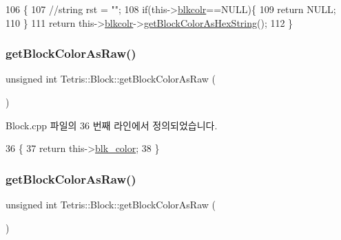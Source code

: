 \begin{DoxyCode}
106                                              \{
107                 \textcolor{comment}{//string rst = "";}
108                 \textcolor{keywordflow}{if}(this->\hyperlink{class_tetris_1_1_block_ab7cfb062eb49e791c94bac4a2e7a7ca9}{blkcolr}==NULL)\{
109                     \textcolor{keywordflow}{return} NULL;
110                 \}
111                 \textcolor{keywordflow}{return} this->\hyperlink{class_tetris_1_1_block_ab7cfb062eb49e791c94bac4a2e7a7ca9}{blkcolr}->\hyperlink{class_tetris_1_1_block_sub_modules_1_1_block_color_a79cc837f207645628542876997c9e919}{getBlockColorAsHexString}();
112             \}
\end{DoxyCode}
\mbox{\label{class_tetris_1_1_block_a8f6bd5020dcfdae501f74b42827344f3}} 
\subsubsection{\texorpdfstring{get\+Block\+Color\+As\+Raw()}{getBlockColorAsRaw()}\hspace{0.1cm}{\footnotesize\ttfamily [1/2]}}
{\footnotesize\ttfamily unsigned int Tetris\+::\+Block\+::get\+Block\+Color\+As\+Raw (\begin{DoxyParamCaption}{ }\end{DoxyParamCaption})}



Block.\+cpp 파일의 36 번째 라인에서 정의되었습니다.


\begin{DoxyCode}
36                                       \{
37                 \textcolor{keywordflow}{return} this->\hyperlink{class_tetris_1_1_block_acf78e864526e38c9c72fa0b012d5b344}{blk\_color};
38             \}
\end{DoxyCode}
\mbox{\label{class_tetris_1_1_block_a8f6bd5020dcfdae501f74b42827344f3}} 
\subsubsection{\texorpdfstring{get\+Block\+Color\+As\+Raw()}{getBlockColorAsRaw()}\hspace{0.1cm}{\footnotesize\ttfamily [2/2]}}
{\footnotesize\ttfamily unsigned int Tetris\+::\+Block\+::get\+Block\+Color\+As\+Raw (\begin{DoxyParamCaption}{ }\end{DoxyParamCaption})\hspace{0.3cm}{\ttfamily [inline]}}

